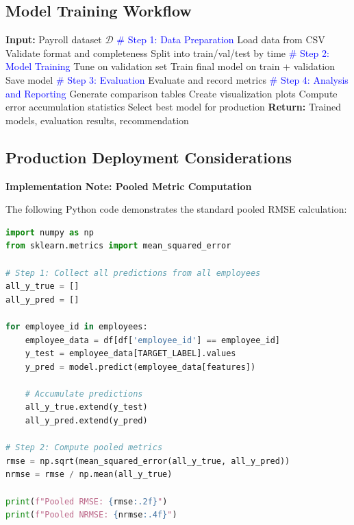 \documentclass[12pt,a4paper]{article}
\begin{document}
\subsection{Model Training Workflow}

\begin{algorithm}[H]
\caption{Complete Model Training and Evaluation Pipeline}
\begin{algorithmic}[1]
\State \textbf{Input:} Payroll dataset $\mathcal{D}$
\State 
\State \textcolor{blue}{\# Step 1: Data Preparation}
\State Load data from CSV
\State Validate format and completeness
\State Split into train/val/test by time
\State
\State \textcolor{blue}{\# Step 2: Model Training}
        \State Tune on validation set
    \EndIf
    \State Train final model on train + validation
    \State Save model
\EndFor
\State
\State \textcolor{blue}{\# Step 3: Evaluation}
        \State Evaluate and record metrics
    \EndFor
\EndFor
\State
\State \textcolor{blue}{\# Step 4: Analysis and Reporting}
\State Generate comparison tables
\State Create visualization plots
\State Compute error accumulation statistics
\State Select best model for production
\State
\State \textbf{Return:} Trained models, evaluation results, recommendation
\end{algorithmic}
\end{algorithm}

\subsection{Production Deployment Considerations}

\textbf{Implementation Note: Pooled Metric Computation}

The following Python code demonstrates the standard pooled RMSE calculation:

\begin{lstlisting}[language=Python]
import numpy as np
from sklearn.metrics import mean_squared_error

# Step 1: Collect all predictions from all employees
all_y_true = []
all_y_pred = []

for employee_id in employees:
    employee_data = df[df['employee_id'] == employee_id]
    y_test = employee_data[TARGET_LABEL].values
    y_pred = model.predict(employee_data[features])
    
    # Accumulate predictions
    all_y_true.extend(y_test)
    all_y_pred.extend(y_pred)

# Step 2: Compute pooled metrics
rmse = np.sqrt(mean_squared_error(all_y_true, all_y_pred))
nrmse = rmse / np.mean(all_y_true)

print(f"Pooled RMSE: {rmse:.2f}")
print(f"Pooled NRMSE: {nrmse:.4f}")
\end{lstlisting}
\end{document}
